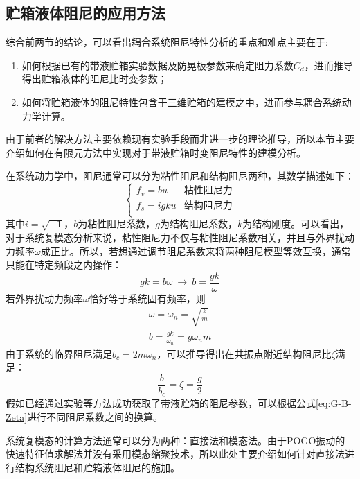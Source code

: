 \subsection{贮箱液体阻尼的应用方法}
综合前两节的结论，可以看出耦合系统阻尼特性分析的重点和难点主要在于:
\begin{enumerate}[leftmargin=\parindent, align=parleft, labelindent=0pt, labelwidth=*]
\item 如何根据已有的带液贮箱实验数据及防晃板参数来确定阻力系数$C_d$，进而推导得出贮箱液体的阻尼比时变参数；
\item 如何将贮箱液体的阻尼特性包含于三维贮箱的建模之中，进而参与耦合系统动力学计算。
\end{enumerate}
由于前者的解决方法主要依赖现有实验手段而非进一步的理论推导，所以本节主要介绍如何在有限元方法中实现对于带液贮箱时变阻尼特性的建模分析。

在系统动力学中，阻尼通常可以分为粘性阻尼和结构阻尼两种，其数学描述如下：
\begin{equation}
	\begin{cases}
	f_v=b\dot{u} & \text{粘性阻尼力}\\
	f_s=\num{i}gku & \text{结构阻尼力} \\
	\end{cases}
\end{equation}
其中$\num{i}=\sqrt{-1}$，$b$为粘性阻尼系数，$g$为结构阻尼系数，$k$为结构刚度。可以看出，对于系统复模态分析来说，粘性阻尼力不仅与粘性阻尼系数相关，并且与外界扰动力频率$\omega$成正比。所以，若想通过调节阻尼系数来将两种阻尼模型等效互换，通常只能在特定频段之内操作：
\begin{equation}
	gk=b\omega\ \longrightarrow\ b=\frac{gk}{\omega}
\end{equation}
若外界扰动力频率$\omega$恰好等于系统固有频率，则
\begin{gather}
	\omega=\omega_n=\sqrt{\frac{k}{m}} \\
	b=\frac{gk}{\omega_n}=g\omega_n m
\end{gather}
由于系统的临界阻尼满足$b_c=2m\omega_n$，可以推导得出在共振点附近结构阻尼比$\zeta$满足：
\begin{equation}
	\label{eq:G-B-Zeta}
	\frac{b}{b_c}=\zeta=\frac{g}{2}
\end{equation}
假如已经通过实验等方法成功获取了带液贮箱的阻尼参数，可以根据公式\eqref{eq:G-B-Zeta}进行不同阻尼系数之间的换算。

系统复模态的计算方法通常可以分为两种：直接法和模态法。由于POGO振动的快速特征值求解法并没有采用模态缩聚技术，所以此处主要介绍如何针对直接法进行结构系统阻尼和贮箱液体阻尼的施加。

